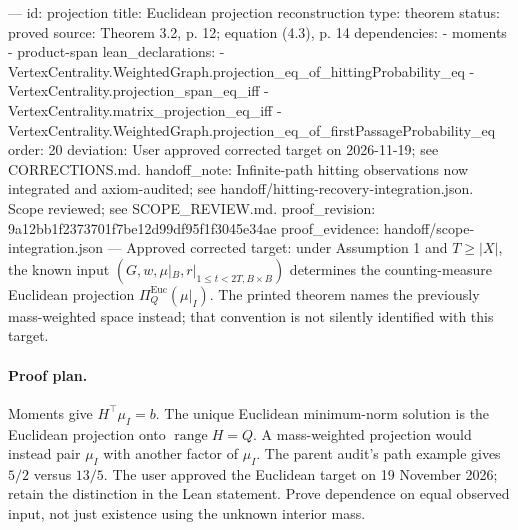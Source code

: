 ---
id: projection
title: Euclidean projection reconstruction
type: theorem
status: proved
source: Theorem 3.2, p. 12; equation (4.3), p. 14
dependencies:
- moments
- product-span
lean_declarations:
- VertexCentrality.WeightedGraph.projection_eq_of_hittingProbability_eq
- VertexCentrality.projection_span_eq_iff
- VertexCentrality.matrix_projection_eq_iff
- VertexCentrality.WeightedGraph.projection_eq_of_firstPassageProbability_eq
order: 20
deviation: User approved corrected target on 2026-11-19; see CORRECTIONS.md.
handoff_note: Infinite-path hitting observations now integrated and axiom-audited; see handoff/hitting-recovery-integration.json. Scope reviewed; see SCOPE_REVIEW.md.
proof_revision: 9a12bb1f2373701f7be12d99df95f1f3045e34ae
proof_evidence: handoff/scope-integration.json
---
Approved corrected target: under Assumption 1 and $T\geq|X|$, the known input $(G,w,\mu|_B,r|_{1\leq t<2T,B\times B})$ determines the counting-measure Euclidean projection $\Pi_Q^{\mathrm{Euc}}(\mu|_I)$. The printed theorem names the previously mass-weighted space instead; that convention is not silently identified with this target.

\paragraph{Proof plan.}
Moments give $H^\top\mu_I=b$. The unique Euclidean minimum-norm solution is the Euclidean projection onto $\operatorname{range}H=Q$. A mass-weighted projection would instead pair $\mu_I$ with another factor of $\mu_I$. The parent audit's path example gives $5/2$ versus $13/5$. The user approved the Euclidean target on 19 November 2026; retain the distinction in the Lean statement. Prove dependence on equal observed input, not just existence using the unknown interior mass.
